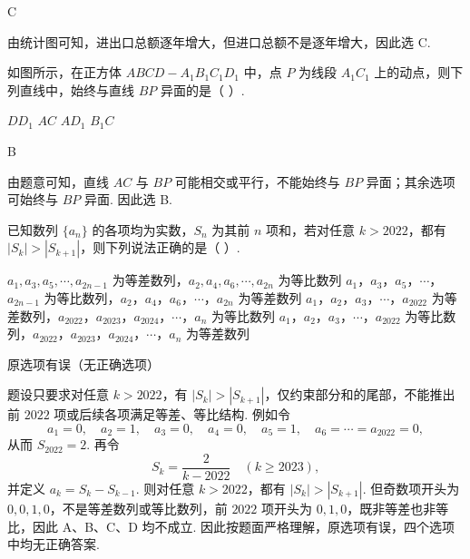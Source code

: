\begin{answer}
C
\end{answer}

\begin{solution}
由统计图可知，进出口总额逐年增大，但进口总额不是逐年增大，因此选 C.
\end{solution}

\begin{problem}
如图所示，在正方体 \(ABCD-A_1B_1C_1D_1\) 中，点 \(P\) 为线段 \(A_1C_1\) 上的动点，则下列直线中，始终与直线 \(BP\) 异面的是（ \quad ）.


\choices
    {\(DD_1\)}
    {\(AC\)}
    {\(AD_1\)}
    {\(B_1C\)}
\end{problem}

\begin{answer}
B
\end{answer}

\begin{solution}
由题意可知，直线 \(AC\) 与 \(BP\) 可能相交或平行，不能始终与 \(BP\) 异面；其余选项可始终与 \(BP\) 异面. 因此选 B.
\end{solution}

\begin{problem}
已知数列 \(\{a_n\}\) 的各项均为实数，\(S_n\) 为其前 \(n\) 项和，若对任意 \(k>2022\)，都有 \(\left|S_k\right|>\left|S_{k+1}\right|\)，则下列说法正确的是（ \quad ）.

\choices
    {\(a_1,a_3,a_5,\cdots,a_{2n-1}\) 为等差数列，\(a_2,a_4,a_6,\cdots,a_{2n}\) 为等比数列}
    {\(a_1\)，\(a_3\)，\(a_5\)，\(\cdots\)，\(a_{2n-1}\) 为等比数列，\(a_2\)，\(a_4\)，\(a_6\)，\(\cdots\)，\(a_{2n}\) 为等差数列}
    {\(a_1\)，\(a_2\)，\(a_3\)，\(\cdots\)，\(a_{2022}\) 为等差数列，\(a_{2022}\)，\(a_{2023}\)，\(a_{2024}\)，\(\cdots\)，\(a_n\) 为等比数列}
    {\(a_1\)，\(a_2\)，\(a_3\)，\(\cdots\)，\(a_{2022}\) 为等比数列，\(a_{2022}\)，\(a_{2023}\)，\(a_{2024}\)，\(\cdots\)，\(a_n\) 为等差数列}
\end{problem}

\begin{answer}
原选项有误（无正确选项）
\end{answer}

\begin{solution}
题设只要求对任意 \(k>2022\)，有 \(\left|S_k\right|>\left|S_{k+1}\right|\)，仅约束部分和的尾部，不能推出前 \(2022\) 项或后续各项满足等差、等比结构. 例如令
\[
a_1=0,\quad a_2=1,\quad a_3=0,\quad a_4=0,\quad a_5=1,\quad a_6=\cdots=a_{2022}=0,
\]
从而 \(S_{2022}=2\). 再令
\[
S_k=\frac{2}{k-2022}\quad(k\ge2023),
\]
并定义 \(a_k=S_k-S_{k-1}\). 则对任意 \(k>2022\)，都有 \(\left|S_k\right|>\left|S_{k+1}\right|\). 但奇数项开头为 \(0,0,1,0\)，不是等差数列或等比数列，前 \(2022\) 项开头为 \(0,1,0\)，既非等差也非等比，因此 A、B、C、D 均不成立. 因此按题面严格理解，原选项有误，四个选项中均无正确答案.
\end{solution}
